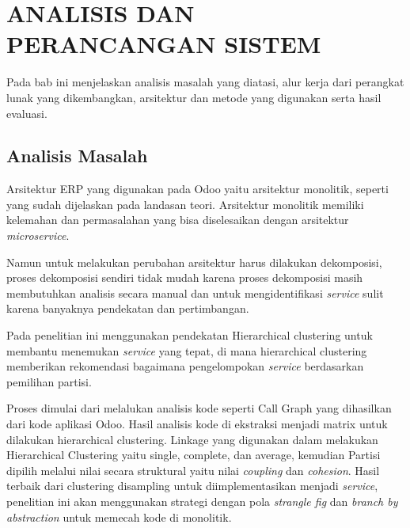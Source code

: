 \chapter{ANALISIS DAN PERANCANGAN SISTEM}
\vspace{4.5pt}

Pada bab ini menjelaskan analisis masalah yang diatasi, alur kerja dari perangkat lunak yang dikembangkan, arsitektur dan metode yang digunakan serta hasil evaluasi.\\

\section{Analisis Masalah}
Arsitektur ERP yang digunakan pada Odoo yaitu arsitektur monolitik, seperti yang sudah dijelaskan pada landasan teori. Arsitektur monolitik memiliki kelemahan dan permasalahan yang bisa diselesaikan dengan arsitektur \textit{microservice}.

Namun untuk melakukan perubahan arsitektur harus dilakukan dekomposisi, proses dekomposisi sendiri tidak mudah karena proses dekomposisi masih membutuhkan analisis secara manual dan untuk mengidentifikasi \textit{service} sulit karena banyaknya pendekatan dan pertimbangan.

Pada penelitian ini menggunakan pendekatan Hierarchical clustering untuk membantu menemukan \textit{service} yang tepat, di mana hierarchical clustering memberikan rekomendasi bagaimana pengelompokan \textit{service} berdasarkan pemilihan partisi.

Proses dimulai dari melalukan analisis kode seperti Call Graph yang dihasilkan dari kode aplikasi Odoo. Hasil analisis kode di ekstraksi menjadi matrix untuk dilakukan hierarchical clustering. Linkage yang digunakan dalam melakukan Hierarchical Clustering yaitu single, complete, dan average, kemudian  Partisi  dipilih melalui nilai secara struktural yaitu nilai \textit{coupling}  dan \textit{cohesion}. Hasil terbaik dari clustering disampling untuk diimplementasikan menjadi \textit{service}, penelitian ini akan menggunakan strategi dengan pola \textit{strangle fig } dan \textit{branch by abstraction} untuk memecah kode di monolitik.

